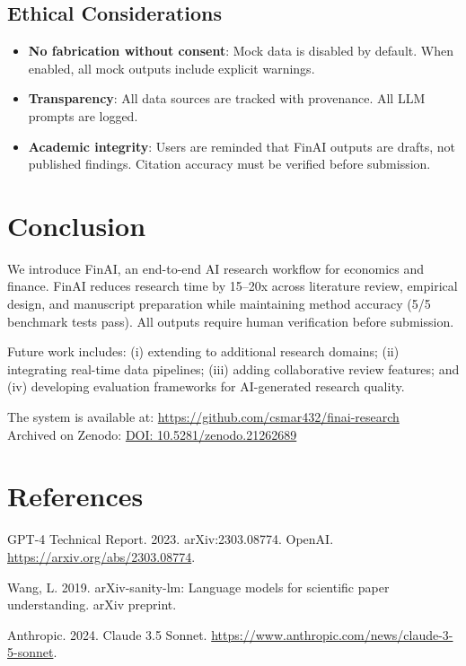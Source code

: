 \documentclass[12pt, a4paper]{article}
\begin{document}
\subsection{Ethical Considerations}

\begin{itemize}
    \item \textbf{No fabrication without consent}: Mock data is disabled by default. When enabled, all mock outputs include explicit warnings.
    \item \textbf{Transparency}: All data sources are tracked with provenance. All LLM prompts are logged.
    \item \textbf{Academic integrity}: Users are reminded that FinAI outputs are drafts, not published findings. Citation accuracy must be verified before submission.
\end{itemize}

\section{Conclusion}

We introduce FinAI, an end-to-end AI research workflow for economics and finance. FinAI reduces research time by 15--20x across literature review, empirical design, and manuscript preparation while maintaining method accuracy (5/5 benchmark tests pass). All outputs require human verification before submission.

Future work includes: (i) extending to additional research domains; (ii) integrating real-time data pipelines; (iii) adding collaborative review features; and (iv) developing evaluation frameworks for AI-generated research quality.

The system is available at: \url{https://github.com/csmar432/finai-research} \\
Archived on Zenodo: \href{https://doi.org/10.5281/zenodo.21262689}{DOI: 10.5281/zenodo.21262689}

\newpage
\section*{References}

\noindent\hangindent=0.6cm
GPT-4 Technical Report.  2023.  arXiv:2303.08774.  OpenAI.  \url{https://arxiv.org/abs/2303.08774}.

\noindent\hangindent=0.6cm
Wang, L.  2019.  arXiv-sanity-lm: Language models for scientific paper understanding.  arXiv preprint.

\noindent\hangindent=0.6cm
Anthropic.  2024.  Claude 3.5 Sonnet.  \url{https://www.anthropic.com/news/claude-3-5-sonnet}.

\end{document}
